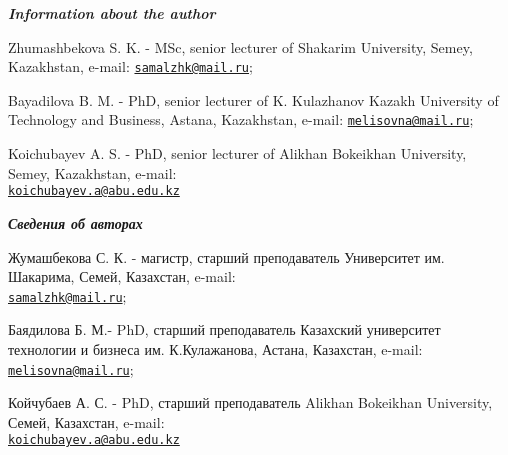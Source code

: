 \begin{authorinfo}
\emph{{\bfseries Information about the author}}

Zhumashbekova S. K. - MSc, senior lecturer of Shakarim University,
Semey, Kazakhstan, e-mail:
\href{mailto:samalzhk@mail.ru}{\nolinkurl{samalzhk@mail.ru}};

Bayadilova B. M. - PhD, senior lecturer of K. Kulazhanov Kazakh
University of Technology and Business, Astana, Kazakhstan, e-mail:
\href{mailto:melisovna@mail.ru}{\nolinkurl{melisovna@mail.ru}};

Koichubayev A. S. - PhD, senior lecturer of Alikhan Bokeikhan
University, Semey, Kazakhstan, e-mail:\\
\href{mailto:koichubayev.a@abu.edu.kz}{\nolinkurl{koichubayev.a@abu.edu.kz}}

\emph{{\bfseries Сведения об авторах}}

Жумашбекова С. К. - магистр, старший преподаватель Университет им.
Шакарима, Семей, Казахстан, e-mail:\\
\href{mailto:samalzhk@mail.ru}{\nolinkurl{samalzhk@mail.ru}};

Баядилова Б. М.- PhD, старший преподаватель Казахский университет
технологии и бизнеса им. К.Кулажанова, Астана, Казахстан, e-mail:
\href{mailto:melisovna@mail.ru}{\nolinkurl{melisovna@mail.ru}};

Койчубаев А. С. - PhD, старший преподаватель Alikhan Bokeikhan
University, Семей, Казахстан, e-mail:\\
\href{mailto:koichubayev.a@abu.edu.kz}{\nolinkurl{koichubayev.a@abu.edu.kz}}
\end{authorinfo}

